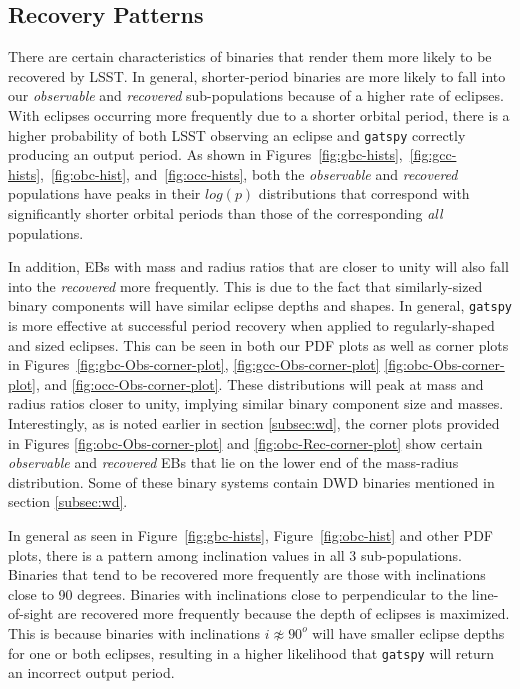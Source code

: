 \documentclass[twocolumn]{aastex63}
\begin{document}
\subsection{Recovery Patterns}
\label{subsec:recovery-patterns}
There are certain characteristics of binaries that render them more likely to be recovered by LSST. In general, shorter-period binaries are more likely to fall into our \textit{observable} and \textit{recovered} sub-populations because of a higher rate of eclipses. With eclipses occurring more frequently due to a shorter orbital period, there is a higher probability of both LSST observing an eclipse and \texttt{gatspy} correctly producing an output period. As shown in Figures~\ref{fig:gbc-hists},~\ref{fig:gcc-hists},~\ref{fig:obc-hist}, and~\ref{fig:occ-hists}, both the \textit{observable} and \textit{recovered} populations have peaks in their $log(p)$ distributions that correspond with significantly shorter orbital periods than those of the corresponding \textit{all} populations.

In addition, EBs with mass and radius ratios that are closer to unity will also fall into the \textit{recovered} more frequently. This is due to the fact that similarly-sized binary components will have similar eclipse depths and shapes. In general, \texttt{gatspy} is more effective at successful period recovery when applied to regularly-shaped and sized eclipses. This can be seen in both our PDF plots as well as corner plots in Figures~\ref{fig:gbc-Obs-corner-plot}, \ref{fig:gcc-Obs-corner-plot} \ref{fig:obc-Obs-corner-plot}, and \ref{fig:occ-Obs-corner-plot}. These distributions will peak at mass and radius ratios closer to unity, implying similar binary component size and masses. Interestingly, as is noted earlier in section \ref{subsec:wd}, the corner plots provided in Figures \ref{fig:obc-Obs-corner-plot} and \ref{fig:obc-Rec-corner-plot} show certain \textit{observable} and \textit{recovered} EBs that lie on the lower end of the mass-radius distribution. Some of these binary systems contain DWD binaries mentioned in section \ref{subsec:wd}.

In general as seen in Figure~\ref{fig:gbc-hists}, Figure~\ref{fig:obc-hist} and other PDF plots, there is a pattern among inclination values in all 3 sub-populations. Binaries that tend to be recovered more frequently are those with inclinations close to 90 degrees. Binaries with inclinations close to perpendicular to the line-of-sight are recovered more frequently because the depth of eclipses is maximized. This is because binaries with inclinations $i \not\approx 90^o$ will have smaller eclipse depths for one or both eclipses, resulting in a higher likelihood that \texttt{gatspy} will return an incorrect output period.
\end{document}
